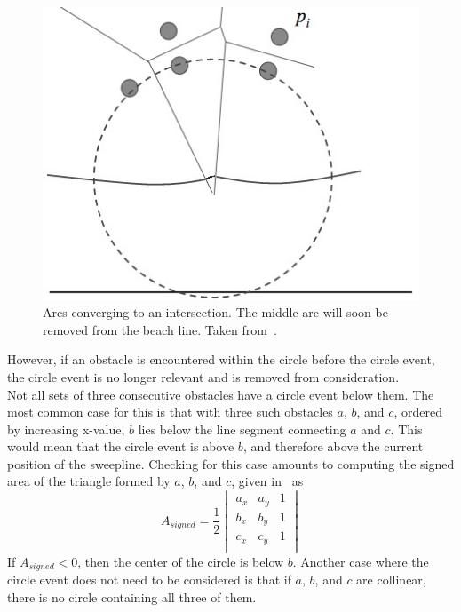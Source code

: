 \documentclass[conference]{IEEEtran}
\begin{document}
\begin{figure}[tp]
    \includegraphics[width=\columnwidth]{circle_event}
    \caption{Arcs converging to an intersection. The middle arc will soon be
    removed from the beach line. Taken from~\cite{mitslides}.}\label{circle_event}
\end{figure}

\indent However, if an obstacle is encountered within the circle before the
circle event, the circle event is no longer relevant and is removed from consideration.\\
\indent Not all sets of three consecutive obstacles have a circle event below them.
The most common case for this is that with three such obstacles $a$, $b$, and $c$,
ordered by increasing x-value, $b$ lies below the line segment connecting $a$ and
$c$. This would mean that the circle event is above $b$, and therefore above the
current position of the sweepline. Checking for this case amounts to computing the
signed area of the triangle formed by $a$, $b$, and $c$, given in~\cite{schaal} as
\begin{equation}
    A_{signed}=\frac{1}{2}
    \begin{vmatrix}
    a_{x} & a_{y} & 1\\
    b_{x} & b_{y} & 1\\
    c_{x} & c_{y} & 1\\
    \end{vmatrix}
\end{equation}
If $A_{signed}<0$, then the center of the circle is below $b$.
Another case where the circle event does not need to be considered is that if
$a$, $b$, and $c$ are collinear, there is no circle containing all three of them.
\end{document}
